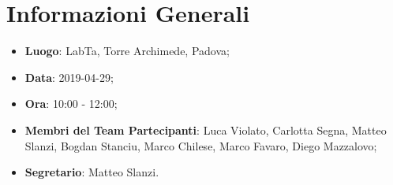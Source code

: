 \section{Informazioni Generali}
\begin{itemize}
	\item \textbf{Luogo}: LabTa, Torre Archimede, Padova; 
	\item \textbf{Data}: 2019-04-29;
	\item \textbf{Ora}: 10:00 - 12:00;
	\item \textbf{Membri del Team Partecipanti}: Luca Violato, Carlotta Segna, Matteo Slanzi, Bogdan Stanciu, Marco Chilese, Marco Favaro, Diego Mazzalovo; 
	\item \textbf{Segretario}: Matteo Slanzi. 
\end{itemize}


